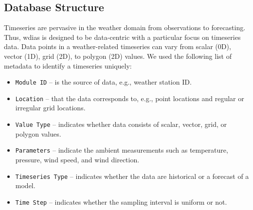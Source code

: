 \documentclass[conference]{IEEEtran}
\newcommand{\db}[1]{\textcolor{blue!40}{#1}}
\begin{document}


\subsection{Database Structure}
\label{psubse:wdias_database}

Timeseries are pervasive in the weather domain from observations to forecasting. Thus, \acrshort{wdias} is designed to be data-centric with a particular focus on timeseries data. Data points in a weather-related timeseries can vary from scalar (0D), vector (1D), grid (2D), to polygon (2D) values. We used the following list of metadata to identify a timeseries uniquely:

\begin{itemize}
    \item \texttt{Module ID} -- is the source of data, e.g., weather station ID.
    \item \texttt{Location} -- that the data corresponds to, e.g., point locations and regular or irregular grid locations.
    \item \texttt{Value Type} -- indicates whether data consists of scalar, vector, grid, or polygon values.
    \item \texttt{Parameters} -- indicate the ambient measurements such as temperature, pressure, wind speed, and wind direction.
    \item \texttt{Timeseries Type} -- indicates whether the data are historical or a forecast of a model.
    \item \texttt{Time Step} -- indicates whether the sampling interval is uniform or not.
\end{itemize}
\end{document}
